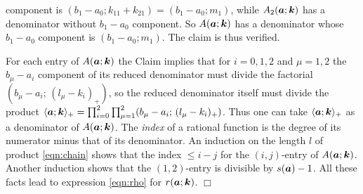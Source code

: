 \documentclass[a4paper,12pt]{article}
\theoremstyle{plain}
\def\ba{\mbox{\boldmath $a$}}
\def\bk{\mbox{\boldmath $k$}}
\begin{document}
component is $(b_1-a_0; k_{11}+k_{21}) = (b_1-a_0; m_1)$, 
while $A_2(\ba; \bk)$ has a denominator without 
$b_1-a_0$ component.  
So $A(\ba; \bk)$ has a denominator whose $b_1-a_0$ 
component is $(b_1-a_0; m_1)$. 
The claim is thus verified.  
\par
For each entry of $A(\ba; \bk)$ the Claim implies that for $i = 0,1,2$ and  
$\mu = 1, 2$ the $b_{\mu}-a_i$ component of its reduced denominator 
must divide the factorial  $(b_{\mu}-a_i; \, (l_{\mu}-k_i)_+)$, so the reduced denominator itself must divide the product 
$\langle \ba; \bk \rangle_+ = \prod_{i=0}^2 \prod_{\mu=1}^2 
(b_{\mu}-a_i; \, (l_{\mu}-k_i)_+)$. 
Thus one can take $\langle \ba; \bk \rangle_+$ as a denominator of 
$A(\ba; \bk)$. 
The {\sl index} of a rational function is the degree of its numerator 
minus that of its denominator. 
An induction on the length $l$ of product \eqref{eqn:chain} shows that 
the index $\le i-j$ for the $(i, j)$-entry of $A(\ba; \bk)$.  
Another induction shows that the $(1, 2)$-entry is divisible by $s(\ba)-1$. 
All these facts lead to expression \eqref{eqn:rho} for $r(\ba; \bk)$.  
\hfill $\Box$ 
\end{document}

